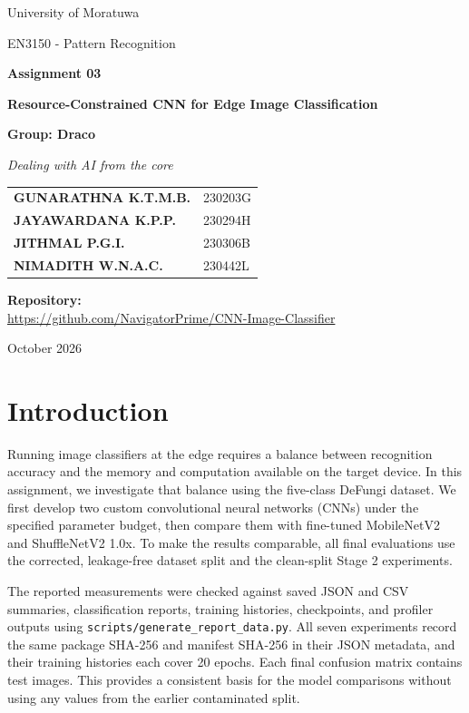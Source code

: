 \documentclass[11pt,a4paper]{article}
\begin{document}
\begin{titlepage}
\centering
{\Large University of Moratuwa\par}
\vspace{0.35cm}
{\large EN3150 - Pattern Recognition\par}
\vspace{1.0cm}
{\Huge\bfseries Assignment 03\par}
\vspace{0.25cm}
{\LARGE\bfseries Resource-Constrained CNN for Edge Image Classification\par}
\vspace{1.0cm}
{\Large\bfseries Group: Draco\par}
{\large\itshape Dealing with AI from the core\par}
\vspace{0.8cm}
\begin{tabular}{ll}
\textbf{GUNARATHNA K.T.M.B.} & 230203G\\
\textbf{JAYAWARDANA K.P.P.} & 230294H\\
\textbf{JITHMAL P.G.I.} & 230306B\\
\textbf{NIMADITH W.N.A.C.} & 230442L\\
\end{tabular}
\vfill
\textbf{Repository:}\\[0.15cm]
\url{https://github.com/NavigatorPrime/CNN-Image-Classifier}
\vfill
{\large October 2026\par}
\end{titlepage}

\tableofcontents
\clearpage
{}

\section{Introduction}
Running image classifiers at the edge requires a balance between recognition accuracy and the memory and computation available on the target device. In this assignment, we investigate that balance using the five-class DeFungi dataset. We first develop two custom convolutional neural networks (CNNs) under the specified parameter budget, then compare them with fine-tuned MobileNetV2 and ShuffleNetV2 1.0x. To make the results comparable, all final evaluations use the corrected, leakage-free dataset split and the clean-split Stage 2 experiments.

The reported measurements were checked against saved JSON and CSV summaries, classification reports, training histories, checkpoints, and profiler outputs using \texttt{scripts/generate\_report\_data.py}. All seven experiments record the same package SHA-256 and manifest SHA-256 in their JSON metadata, and their training histories each cover 20 epochs. Each final confusion matrix contains \DatasetTest{} test images. This provides a consistent basis for the model comparisons without using any values from the earlier contaminated split.
\end{document}
